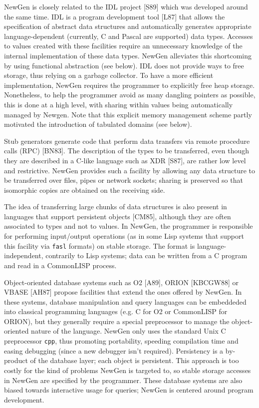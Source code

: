 NewGen is closely related to the IDL project [S89] which was developed
around the same time. IDL is a program development tool [L87] that
allows the specification of abstract data structures and automatically
generates appropriate language-dependent (currently, C and Pascal are
supported) data types. Accesses to values created with these facilities
require an unnecessary knowledge of the internal implementation of these
data types. NewGen alleviates this shortcoming by using functional
abstraction (see below). IDL does not provide ways to free storage, thus
relying on a garbage collector. To have a more efficient implementation,
NewGen requires the programmer to explicitly free heap storage.
Nonetheless, to help the programmer avoid as many dangling pointers as
possible, this is done at a high level, with sharing within values being
automatically managed by Newgen. Note that this explicit memory
management scheme partly motivated the introduction of tabulated domains
(see below).

Stub generators generate code that perform data transfers via remote
procedure calls (RPC) [BN83]. The description of the types to be
transferred, even though they are described in a C-like language such as
XDR [S87], are rather low level and restrictive. NewGen provides such a
facility by allowing any data structure to be transferred over files,
pipes or network sockets; sharing is preserved so that isomorphic copies
are obtained on the receiving side.

The idea of transferring large chunks of data structures is also present
in languages that support persistent objects [CM85], although they are
often associated to types and not to values. In NewGen, the programmer
is responsible for performing input/output operations (as in some Lisp
systems that support this facility via {\tt fasl} formats) on stable
storage. The format is language-independent, contrarily to Lisp systems;
data can be written from a C program and read in a CommonLISP process.

Object-oriented database systems such as O2 [A89], ORION [KBCGW88] or
VBASE [AH87] propose facilities that extend the ones offered by NewGen.
In these systems, database manipulation and query languages can be
embeddeded into classical programming languages (e.g.  C for O2 or
CommonLISP for ORION), but they generally require a special preprocessor
to manage the object-oriented nature of the language. NewGen only uses
the standard Unix C preprocessor {\tt cpp}, thus promoting portability,
speeding compilation time and easing debugging (since a new debugger
isn't required). Persistency is a by-product of the database layer; each
object is persistent. This approach is too costly for the kind of
problems NewGen is targeted to, so stable storage accesses in NewGen are
specified by the programmer. These database systems are also biased
towards interactive usage for queries; NewGen is centered around program
development.

